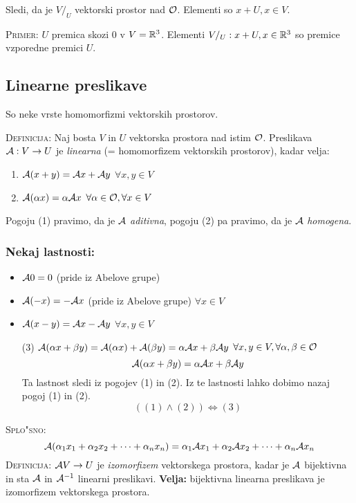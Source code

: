 Sledi, da je $V/_U$ vektorski prostor nad $\mathcal{O}$. Elementi so $x + U, x \in V$.

\textsc{Primer:} $U$ premica skozi 0 v $V = \mathbb{R}^3$. Elementi $V/_U: x + U, x \in \mathbb{R}^3$ so premice vzporedne premici $U$.
%
\subsection{Linearne preslikave}
So neke vrste homomorfizmi vektorskih prostorov.

\textsc{Definicija:} Naj bosta $V$ in $U$ vektorska prostora nad istim $\mathcal{O}$. Preslikava $\mathcal{A} : V \to U$ je \emph{linearna} (= homomorfizem vektorskih prostorov), kadar velja:
\begin{enumerate}[(1)]
	\item $\mathcal{A}(x + y) = \mathcal{A} x + \mathcal{A} y$ \hfill $\forall x, y \in V$
	\item $\mathcal{A}(\alpha x) = \alpha \mathcal{A} x$ \hfill $\forall \alpha \in \mathcal{O}, \forall x \in V$
\end{enumerate}
Pogoju (1) pravimo, da je $\mathcal{A}$ \emph{aditivna}, pogoju (2) pa pravimo, da je $\mathcal{A}$ \emph{homogena}.
\subsubsection*{Nekaj lastnosti:}
\begin{itemize}
	\item $\mathcal{A}0 = 0$ (pride iz Abelove grupe)
	\item $\mathcal{A} (-x) =  -\mathcal{A} x$ (pride iz Abelove grupe) \hfill $\forall x \in V$
	\item $\mathcal{A}(x-y) = \mathcal{A} x - \mathcal{A} y$ \hfill $\forall x, y \in V$
	\item[(3)] $\mathcal{A}(\alpha x + \beta y) = \mathcal{A}(\alpha x) + \mathcal{A}(\beta y) = \alpha \mathcal{A} x + \beta \mathcal{A} y$ \hfill $\forall x, y \in V, \forall \alpha, \beta \in \mathcal{O}$
	\begin{equation*}
	\mathcal{A}(\alpha x + \beta y) = \alpha \mathcal{A} x + \beta \mathcal{A} y
	\end{equation*}
	Ta lastnost sledi iz pogojev (1) in (2). Iz te lastnosti lahko dobimo nazaj pogoj (1) in (2).
	\begin{equation*}
	((1) \land (2)) \iff (3)
	\end{equation*}
\end{itemize}
\textsc{Splo"sno:}
\begin{equation*}
	\mathcal{A}(\alpha_1 x_1 + \alpha_2 x_2 + \cdots + \alpha_n x_n) = \alpha_1 \mathcal{A} x_1 + \alpha_2 \mathcal{A} x_2 + \cdots + \alpha_n \mathcal{A} x_n
\end{equation*}
%
\textsc{Definicija:} $\mathcal{A} V \to U$ je \emph{izomorfizem} vektorskega prostora, kadar je $\mathcal{A}$ bijektivna in sta $\mathcal{A}$ in $\mathcal{A}^{-1}$ linearni preslikavi. \textbf{Velja:} bijektivna linearna preslikava je izomorfizem vektorskega prostora.

